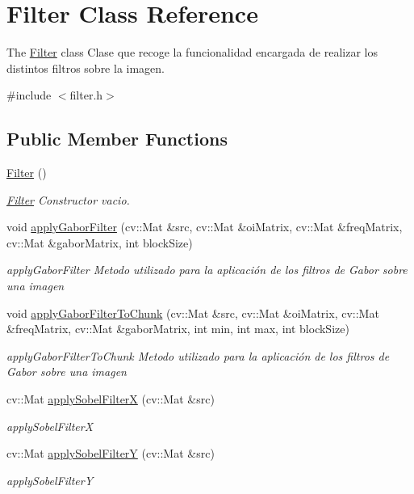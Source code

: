 \hypertarget{class_filter}{\section{Filter Class Reference}
\label{class_filter}
}


The \hyperlink{class_filter}{Filter} class Clase que recoge la funcionalidad encargada de realizar los distintos filtros sobre la imagen.  




{\ttfamily \#include $<$filter.\+h$>$}

\subsection*{Public Member Functions}
\begin{DoxyCompactItemize}
\item 
\hypertarget{class_filter_ad15994c30d497afd567a6445446a249e}{\hyperlink{class_filter_ad15994c30d497afd567a6445446a249e}{Filter} ()}\label{class_filter_ad15994c30d497afd567a6445446a249e}

\begin{DoxyCompactList}\small\item\em \hyperlink{class_filter}{Filter} Constructor vacio. \end{DoxyCompactList}\item 
void \hyperlink{class_filter_a22cd4f0258d34426a3a3155a12d1c574}{apply\+Gabor\+Filter} (cv\+::\+Mat \&src, cv\+::\+Mat \&oi\+Matrix, cv\+::\+Mat \&freq\+Matrix, cv\+::\+Mat \&gabor\+Matrix, int block\+Size)
\begin{DoxyCompactList}\small\item\em apply\+Gabor\+Filter Metodo utilizado para la aplicación de los filtros de Gabor sobre una imagen \end{DoxyCompactList}\item 
void \hyperlink{class_filter_a1c28fce1c31afe8e44c5c059593e686b}{apply\+Gabor\+Filter\+To\+Chunk} (cv\+::\+Mat \&src, cv\+::\+Mat \&oi\+Matrix, cv\+::\+Mat \&freq\+Matrix, cv\+::\+Mat \&gabor\+Matrix, int min, int max, int block\+Size)
\begin{DoxyCompactList}\small\item\em apply\+Gabor\+Filter\+To\+Chunk Metodo utilizado para la aplicación de los filtros de Gabor sobre una imagen \end{DoxyCompactList}\item 
cv\+::\+Mat \hyperlink{class_filter_a0d8a2b258d04ed38be4e37cc7a5a4d76}{apply\+Sobel\+Filter\+X} (cv\+::\+Mat \&src)
\begin{DoxyCompactList}\small\item\em apply\+Sobel\+Filter\+X \end{DoxyCompactList}\item 
cv\+::\+Mat \hyperlink{class_filter_a72c5cd12e966515a3683ae61a16fa26d}{apply\+Sobel\+Filter\+Y} (cv\+::\+Mat \&src)
\begin{DoxyCompactList}\small\item\em apply\+Sobel\+Filter\+Y \end{DoxyCompactList}\end{DoxyCompactItemize}


